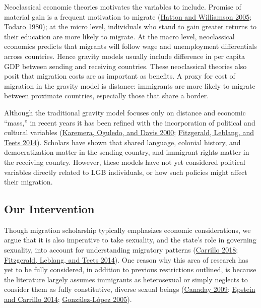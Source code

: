 \documentclass[
  11pt,
]{article}
\begin{document}
Neoclassical economic theories motivates the variables to include. Promise of material gain is a frequent motivation to migrate (\protect\hyperlink{ref-hatton_2005a}{Hatton and Williamson 2005}; \protect\hyperlink{ref-todaro_1980}{Todaro 1980}); at the micro level, individuals who stand to gain greater returns to their education are more likely to migrate. At the macro level, neoclassical economics predicts that migrants will follow wage and unemployment differentials across countries. Hence gravity models usually include difference in per capita GDP between sending and receiving countries. These neoclassical theories also posit that migration costs are as important as benefits. A proxy for cost of migration in the gravity model is distance: immigrants are more likely to migrate between proximate countries, especially those that share a border.

Although the traditional gravity model focuses only on distance and economic ``mass,'' in recent years it has been refined with the incorporation of political and cultural variables (\protect\hyperlink{ref-karemera_2000}{Karemera, Oguledo, and Davis 2000}; \protect\hyperlink{ref-fitzgerald_2014}{Fitzgerald, Leblang, and Teets 2014}). Scholars have shown that shared language, colonial history, and democratization matter in the sending country, and immigrant rights matter in the receiving country. However, these models have not yet considered political variables directly related to LGB individuals, or how such policies might affect their migration.

\hypertarget{our-intervention}{%
\subsection{Our Intervention}\label{our-intervention}}

Though migration scholarship typically emphasizes economic considerations, we argue that it is also imperative to take sexuality, and the state's role in governing sexuality, into account for understanding migratory patterns (\protect\hyperlink{ref-carrillo_2018}{Carrillo 2018}; \protect\hyperlink{ref-fitzgerald_2014}{Fitzgerald, Leblang, and Teets 2014}). One reason why this area of research has yet to be fully considered, in addition to previous restrictions outlined, is because the literature largely assumes immigrants as heterosexual or simply neglects to consider them as fully constitutive, diverse sexual beings (\protect\hyperlink{ref-canaday_2009}{Canaday 2009}; \protect\hyperlink{ref-epstein_2014}{Epstein and Carrillo 2014}; \protect\hyperlink{ref-gonzalez-lopez_2005}{González-López 2005}).
\end{document}
